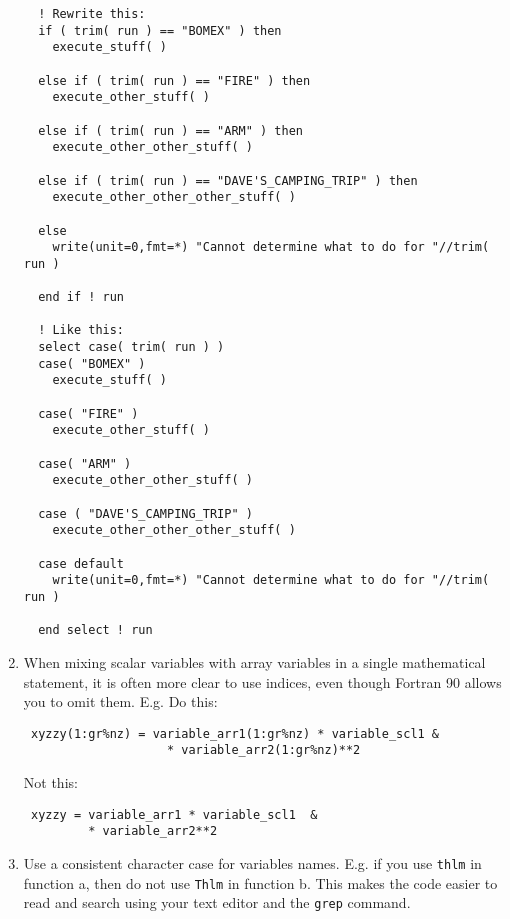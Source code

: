 \documentclass[letterpaper,12pt]{article}
\begin{document}
\begin{enumerate}
\begin{verbatim}
  ! Rewrite this:
  if ( trim( run ) == "BOMEX" ) then
    execute_stuff( )

  else if ( trim( run ) == "FIRE" ) then
    execute_other_stuff( )

  else if ( trim( run ) == "ARM" ) then
    execute_other_other_stuff( ) 

  else if ( trim( run ) == "DAVE'S_CAMPING_TRIP" ) then
    execute_other_other_other_stuff( ) 

  else
    write(unit=0,fmt=*) "Cannot determine what to do for "//trim( run )

  end if ! run

  ! Like this:
  select case( trim( run ) )
  case( "BOMEX" )
    execute_stuff( )

  case( "FIRE" )
    execute_other_stuff( )

  case( "ARM" )
    execute_other_other_stuff( )
 
  case ( "DAVE'S_CAMPING_TRIP" ) 
    execute_other_other_other_stuff( ) 

  case default
    write(unit=0,fmt=*) "Cannot determine what to do for "//trim( run )

  end select ! run

\end{verbatim}

\item When mixing scalar variables with array variables in a single
mathematical statement, it is often more clear to use indices, even
though Fortran 90 allows you to omit them. \newline
E.g. Do this:

\begin{verbatim}
 xyzzy(1:gr%nz) = variable_arr1(1:gr%nz) * variable_scl1 &
                    * variable_arr2(1:gr%nz)**2
\end{verbatim}

Not this:
\begin{verbatim}
 xyzzy = variable_arr1 * variable_scl1  &
         * variable_arr2**2
\end{verbatim}

\item Use a consistent character case for variables names. 
E.g. if you use \texttt{thlm} in function a, then do not use \texttt{Thlm} in function b. 
This makes the code easier to read and search using your text editor and the 
\texttt{grep} command.
\newline


\end{enumerate}
\end{document}
